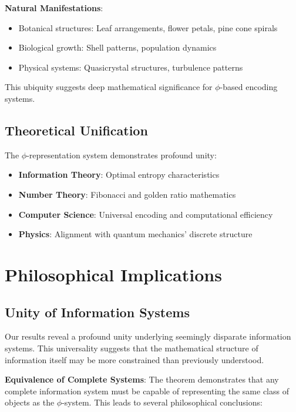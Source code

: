 \documentclass[12pt,letterpaper]{article}
\begin{document}
\textbf{Natural Manifestations}:
\begin{itemize}
\item Botanical structures: Leaf arrangements, flower petals, pine cone spirals
\item Biological growth: Shell patterns, population dynamics
\item Physical systems: Quasicrystal structures, turbulence patterns
\end{itemize}

This ubiquity suggests deep mathematical significance for $\phi$-based encoding systems.

\subsection{Theoretical Unification}

The $\phi$-representation system demonstrates profound unity:
\begin{itemize}
\item \textbf{Information Theory}: Optimal entropy characteristics
\item \textbf{Number Theory}: Fibonacci and golden ratio mathematics  
\item \textbf{Computer Science}: Universal encoding and computational efficiency
\item \textbf{Physics}: Alignment with quantum mechanics' discrete structure
\end{itemize}

\section{Philosophical Implications}

\subsection{Unity of Information Systems}

Our results reveal a profound unity underlying seemingly disparate information systems. This universality suggests that the mathematical structure of information itself may be more constrained than previously understood.

\textbf{Equivalence of Complete Systems}: The theorem demonstrates that any complete information system must be capable of representing the same class of objects as the $\phi$-system. This leads to several philosophical conclusions:
\end{document}
